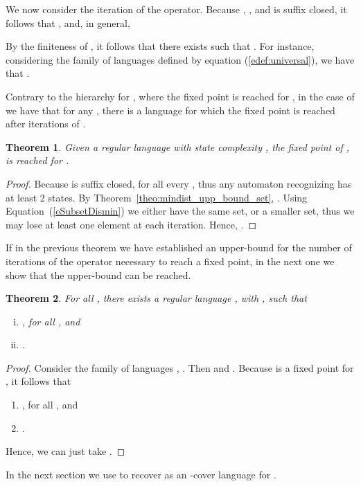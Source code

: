 \documentclass{article}
\newtheorem{theorem}{Theorem}
\begin{document}
We now consider the iteration of the  operator. 
Because , ,
 and  is suffix closed, it follows that
  , and,  in general, 


By the finiteness of , it follows 
 that there exists  such that .
  For instance, considering the family of languages 
 defined by equation (\ref{edef:universal}), we have that  .

Contrary to the hierarchy for , where the fixed point is reached for ,
 in the case of  we have that  for any , 
there is a language for which the fixed point is reached after  iterations of .

\begin{theorem}
\label{theo:fpdismin}
Given a regular language  with state complexity , 
the fixed point of , is reached for . 
\end{theorem}

\begin{proof}
Because  is suffix closed, 
 for all every , thus
any automaton recognizing  has at least 2 states.
By Theorem~\ref{theo:mindist_upp_bound_set}, 
. 
Using Equation~(\ref{eSubsetDismin})
we either have the same set, or a smaller set, thus we may lose 
at least one element at each iteration. Hence, .
\end{proof}

If in the previous theorem we have established an upper-bound for the number of iterations 
of the  operator necessary to reach a fixed point, in the next one we show that the 
upper-bound can be reached.
 
\begin{theorem}
\label{theo:fpdismint}
For all  , there exists a regular language , 
with , such that
\begin{enumerate}[i)]
 \item , for all , and 
 \item .
\end{enumerate}
\end{theorem}

\begin{proof}
Consider the family of languages 
, . 
Then  and
.
Because  is a fixed point for , it follows that
\begin{enumerate}
 \item , for all , and 
  \item .
\end{enumerate}
Hence, we can just take .
\end{proof}

In the next section we use  to recover  as an -cover language for 
.
\end{document}
